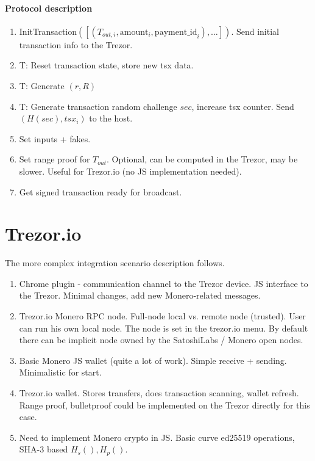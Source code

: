 \documentclass[]{article}
\begin{document}
\paragraph{Protocol description}
\begin{enumerate}
	\item InitTransaction$( [(T_{out,i}, \text{amount}_i, \text{payment\_id}_i), \dots])$. Send initial transaction info to the Trezor.
	
	\item T: Reset transaction state, store new tsx data.
	
	\item T: Generate $(r, R)$
	
	\item T: Generate transaction random challenge $sec$, increase tsx counter. Send $(H(sec), tsx_i)$ to the host. 
	
	\item Set inputs + fakes.
	
	\item Set range proof for $T_{out}$. Optional, can be computed in the Trezor, may be slower. Useful for Trezor.io (no JS implementation needed).
	
	\item Get signed transaction ready for broadcast.
	

\end{enumerate}

\section{Trezor.io}

The more complex integration scenario description follows.
\begin{enumerate}
	\item Chrome plugin - communication channel to the Trezor device. 
	JS interface to the Trezor. Minimal changes, add new Monero-related messages.
	
	\item Trezor.io Monero RPC node. Full-node local vs. remote node (trusted). User can run his own local node. The node is set in the trezor.io menu. By default there can be implicit node owned by the SatoshiLabs / Monero open nodes.
	
	\item Basic Monero JS wallet (quite a lot of work). Simple receive + sending. Minimalistic for start.
	
	\item Trezor.io wallet. Stores transfers, does transaction scanning, wallet refresh. Range proof, bulletproof could be implemented on the Trezor directly for this case. 
	 
	\item Need to implement Monero crypto in JS. Basic curve ed25519 operations, SHA-3 based $H_s(), H_p()$.
	 
\end{enumerate}
\end{document}

